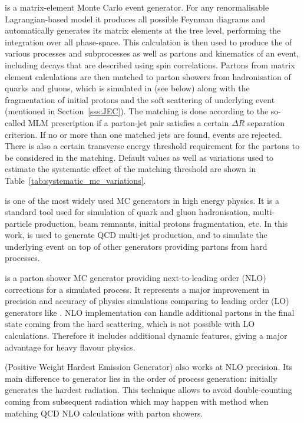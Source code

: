 \begin{description}[wide=\parindent, style=standard, labelsep=0pt]
\item [\MADGRAPH] \autocite{MadGraph} is a matrix-element Monte Carlo event generator. For any renormalisable
Lagrangian-based model it produces all possible Feynman diagrams and automatically generates its matrix elements at the
tree level, performing the integration over all phase-space. This calculation is then used to produce the \xsect of
various processes and subprocesses as well as partons and kinematics of an event, including decays that are described
using spin correlations. Partons from matrix element calculations are then matched to parton showers from hadronisation
of quarks and gluons, which is simulated in \PYTHIA (see below) along with the fragmentation of initial protons and the
soft scattering of underlying event (mentioned in Section~\ref{sss:JEC}). The matching is done according to the
so-called MLM prescription \autocite{MLM} if a parton-jet pair satisfies a certain $\Delta R$ separation criterion. If
no or more than one matched jets are found, events are rejected. There is also a certain transverse energy threshold
requirement for the partons to be considered in the matching. Default values as well as variations used to estimate the
systematic effect of the matching threshold are shown in Table~\ref{tab:systematic_mc_variations}.

\item [\PYTHIA] \autocite{Pythia,Pythia6.4} is one of the most widely used MC generators in high energy physics. It is a
standard tool used for simulation of quark and gluon hadronisation, multi-particle production, beam remnants, initial
protons fragmentation, etc. In this work, \PYTHIA is used to generate QCD multi-jet production, and to simulate the
underlying event on top of other generators providing partons from hard processes.

\item [\MCATNLO] \autocite{MCatNLO} is a parton shower MC generator providing next-to-leading order (NLO) corrections
for a simulated process. It represents a major improvement in precision and accuracy of physics simulations comparing to
leading order (LO) generators like \PYTHIA. NLO implementation can handle additional partons in the final state coming
from the hard scattering, which is not possible with LO calculations. Therefore it includes additional dynamic features,
giving a major advantage for heavy flavour physics.

\item [\POWHEG] (Positive Weight Hardest Emission Generator) \autocite{POWHEG} also works at NLO precision. Its main
difference to \MCATNLO generator lies in the order of process generation: \POWHEG initially generates the hardest
radiation. This technique allows to avoid double-counting coming from subsequent radiation which may happen with
\MCATNLO method when matching QCD NLO calculations with parton showers.

\end{description}

